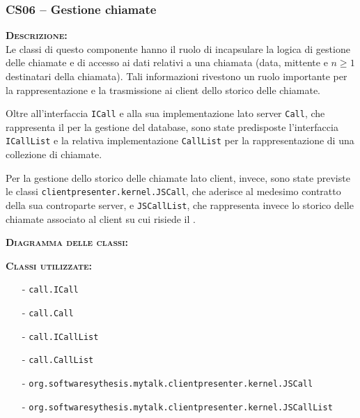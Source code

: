 \subsubsection{CS06 -- Gestione chiamate}
\begin{description}
  \item{\scshape\bfseries Descrizione:}\\
Le classi di questo componente hanno il ruolo di incapsulare la logica di gestione delle chiamate e di accesso ai dati relativi a una chiamata (data, mittente e $n\geq1$ destinatari della chiamata). Tali informazioni rivestono un ruolo importante per la rappresentazione e la trasmissione ai client dello storico delle chiamate.

Oltre all'interfaccia \texttt{ICall} e alla sua implementazione lato server \texttt{Call}, che rappresenta il  per la gestione del database, sono state predisposte l'interfaccia \texttt{ICallList} e la relativa implementazione \texttt{CallList} per la rappresentazione di una collezione di chiamate.

Per la gestione dello storico delle chiamate lato client, invece, sono state previste le classi \texttt{clientpresenter.kernel.JSCall}, che aderisce al medesimo contratto della sua controparte server, e \texttt{JSCallList}, che rappresenta invece lo storico delle chiamate associato al client su cui risiede il .

  \item{\scshape\bfseries Diagramma delle classi:}

  \item{\scshape\bfseries Classi utilizzate:}\\
  \begin{itemize}[noitemsep,nolistsep]
    \item[-] \texttt{call.ICall}
    \item[-] \texttt{call.Call}
    \item[-] \texttt{call.ICallList}
    \item[-] \texttt{call.CallList}
    \item[-] \texttt{org.softwaresythesis.mytalk.clientpresenter.kernel.JSCall}
    \item[-] \texttt{org.softwaresythesis.mytalk.clientpresenter.kernel.JSCallList}
  \end{itemize}
\end{description}


